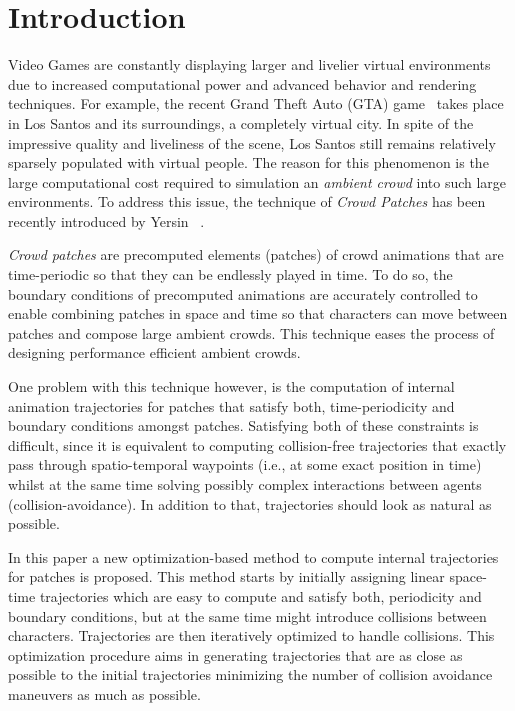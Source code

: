 \section{Introduction}
\label{sec:intro}

Video Games are constantly displaying larger and livelier virtual environments due to increased computational power and advanced behavior and rendering techniques.
For example, the recent Grand Theft Auto (GTA) game~\cite{GTA:web} takes place in Los Santos and its surroundings, a completely virtual city.
In spite of the impressive quality and liveliness of the scene, Los Santos still remains relatively sparsely populated with virtual people.
The reason for this phenomenon is the large computational cost required to simulation an {\it ambient crowd} into such large environments.
To address this issue, the technique of {\it Crowd Patches} has been recently introduced by Yersin \etal~\cite{Yersin:2009}.

{\it Crowd patches} are precomputed elements (patches) of crowd animations that are time-periodic so that they can be endlessly played in time.
To do so, the boundary conditions of precomputed animations are accurately controlled to enable combining patches in space and time so that characters can move between patches and compose large ambient crowds.
This technique eases the process of designing performance efficient ambient crowds. 

One problem with this technique however, is the computation of internal animation trajectories for patches that satisfy both, time-periodicity and boundary conditions amongst patches.
Satisfying both of these constraints is difficult, since it is equivalent to computing collision-free trajectories that exactly pass through spatio-temporal waypoints (i.e., at some exact position in time) whilst at the same time solving possibly complex interactions between agents (collision-avoidance).
In addition to that, trajectories should look as natural as possible.

In this paper a new optimization-based method to compute internal trajectories for patches is proposed.
This method starts by initially assigning linear space-time trajectories which are easy to compute and satisfy both, periodicity and boundary conditions, but at the same time might introduce collisions between characters.
Trajectories are then iteratively optimized to handle collisions.
This optimization procedure aims in generating trajectories that are as close as possible to the initial trajectories minimizing the number of collision avoidance maneuvers as much as possible.

